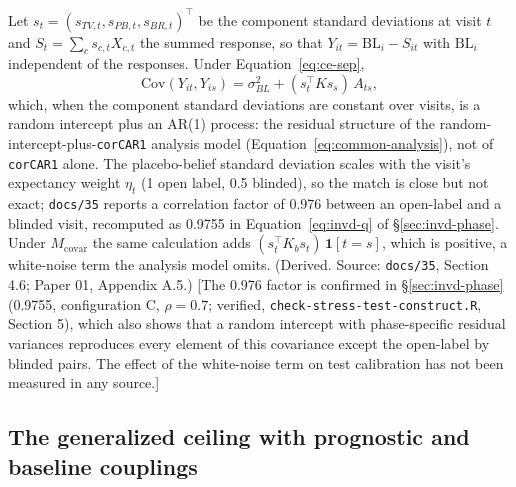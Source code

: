 \documentclass[11pt]{article}
\newcommand{\note}[1]{\textcolor{blue!60!black}{\small [#1]}}
\newcommand{\code}[1]{\texttt{#1}}
\begin{document}
Let $s_t = (s_{TV,t}, s_{PB,t}, s_{BR,t})^{\top}$ be the component
standard deviations at visit $t$ and $S_t = \sum_c s_{c,t} X_{c,t}$
the summed response, so that $Y_{it} = \mathrm{BL}_i - S_{it}$ with
$\mathrm{BL}_i$ independent of the responses. Under
Equation~\eqref{eq:ce-sep},
\begin{equation}
\mathrm{Cov}(Y_{it}, Y_{is}) = \sigma_{BL}^2 + (s_t^{\top} K s_s)\,
  A_{ts},
\label{eq:ce-outcome-cov}
\end{equation}
which, when the component standard deviations are constant over
visits, is a random intercept plus an AR(1) process: the residual
structure of the random-intercept-plus-\code{corCAR1} analysis model
(Equation~\eqref{eq:common-analysis}), not of \code{corCAR1} alone.
The placebo-belief standard deviation scales with the visit's
expectancy weight $\eta_t$ (1 open label, 0.5 blinded), so the match is
close but not exact; \code{docs/35} reports a correlation factor of
0.976 between an open-label and a blinded visit, recomputed as 0.9755
in Equation~\eqref{eq:invd-q} of \S\ref{sec:invd-phase}. Under
$M_{\mathrm{covar}}$ the same calculation adds
$(s_t^{\top} K_b s_t)\,\mathbf 1[t = s]$, which is positive, a
white-noise term the analysis model omits. (Derived. Source:
\code{docs/35}, Section 4.6; Paper 01, Appendix A.5.) \note{The 0.976
factor is confirmed in \S\ref{sec:invd-phase} (0.9755, configuration C,
$\rho = 0.7$; verified, \code{check-stress-test-construct.R}, Section 5), which also
shows that a random intercept with phase-specific residual variances
reproduces every element of this covariance except the open-label by
blinded pairs. The effect of the white-noise term on test calibration
has not been measured in any source.}

\subsection{The generalized ceiling with prognostic and baseline
couplings}
\end{document}
